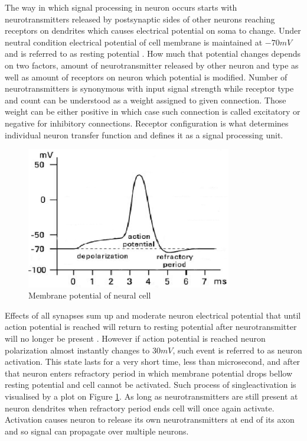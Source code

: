 The way in which signal processing in neuron occurs starts with neurotransmitters released by
postsynaptic sides of other neurons reaching receptors on dendrites which causes electrical
potential on soma to change. Under neutral condition electrical potential of cell membrane is 
maintained at $-70 mV$ and is referred to as resting potential \cite{Tadeusiewicz1994}. 
How much that potential changes depends on two factors, amount of neurotransmitter released by 
other neuron and type as well as  amount of receptors on neuron which potential is modified.
Number of neurotransmitters is synonymous with input signal strength while receptor type and count
can be understood as a  weight assigned to given connection.
Those weight can be either positive in which case such connection is called excitatory or negative 
for inhibitory connections. 
Receptor configuration is what determines individual neuron transfer function and defines it as 
a signal processing unit.  
\begin{figure}[htb] 
	\centering
	\includegraphics[width=0.8\textwidth]{figures/bio_activation}
	\caption{Membrane potential of neural cell \cite{Verber2012}}
	\label{fig:bio_activation}
\end{figure}
Effects of all synapses sum up and moderate neuron electrical potential that until action 
potential is reached will return to resting potential after neurotransmitter will no longer
be present \cite{Osowski1994}. However if action potential is reached neuron polarization almost
instantly changes to $30 mV$, such event is referred to as neuron activation. 
This state lasts for a very short time, less than microsecond, and after that neuron enters
refractory period in which membrane potential drops bellow resting potential and cell cannot
be activated. Such process of singleactivation is visualised by a plot on Figure 
\ref{fig:bio_activation}. As long as neurotransmitters are still present at neuron dendrites when
refractory period ends cell will once again activate.
Activation causes neuron to release its own neurotransmitters at end of its axon and so signal
can propagate over multiple neurons. 

